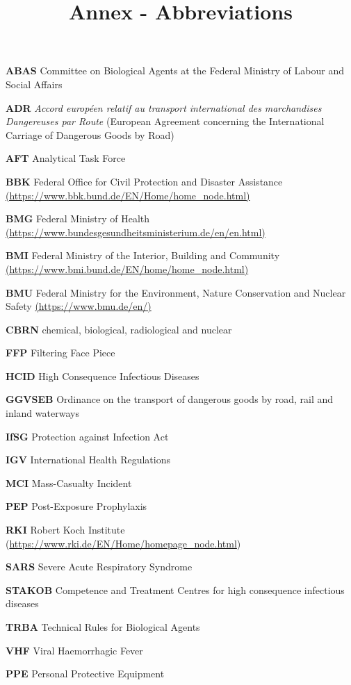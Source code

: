 \documentclass{article}
\begin{document}
\title{Annex - Abbreviations}

\maketitle





\textbf{ABAS }Committee on Biological Agents at the Federal Ministry of Labour and Social Affairs


\textbf{ADR }\emph{Accord européen relatif au transport international des}\emph{\textbf{ }}\emph{marchandises Dangereuses par Route} (European Agreement concerning the International Carriage of Dangerous Goods by Road)


\textbf{AFT }Analytical Task Force


\textbf{BBK }Federal Office for Civil Protection and Disaster Assistance\textbf{ }\href{https://www.bbk.bund.de/EN/Home/home_node.html}{(https://www.bbk.bund.de/EN/Home/home\_node.html)}


\textbf{BMG }Federal Ministry of Health\textbf{ }\href{https://www.bundesgesundheitsministerium.de/en/en.html}{(https://www.bundesgesundheitsministerium.de/en/en.html)}


\textbf{BMI }Federal Ministry of the Interior, Building and Community\textbf{ }\href{https://www.bmi.bund.de/EN/home/home_node.html}{(https://www.bmi.bund.de/EN/home/home\_node.html)} 


\textbf{BMU }Federal Ministry for the Environment, Nature Conservation and Nuclear\textbf{ }Safety \href{https://www.bmu.de/en/}{(https://www.bmu.de/en/)}


\textbf{CBRN }chemical, biological, radiological and nuclear


\textbf{FFP }Filtering Face Piece


\textbf{HCID }High Consequence Infectious Diseases \textbf{ }


\textbf{GGVSEB }Ordinance on the transport of dangerous goods by road, rail and inland waterways


\textbf{IfSG }Protection against Infection Act


\textbf{IGV }International Health Regulations


\textbf{MCI }Mass-Casualty Incident


\textbf{PEP }Post-Exposure Prophylaxis


\textbf{RKI }Robert Koch Institute (\href{https://www.rki.de/EN/Home/homepage_node.html}{https://www.rki.de/EN/Home/homepage\_node.html})


\textbf{SARS} Severe Acute Respiratory Syndrome


\textbf{STAKOB }Competence and Treatment Centres for high consequence infectious diseases


\textbf{TRBA }Technical Rules for Biological Agents


\textbf{VHF }Viral Haemorrhagic Fever


\textbf{PPE }Personal Protective Equipment
\end{document}
